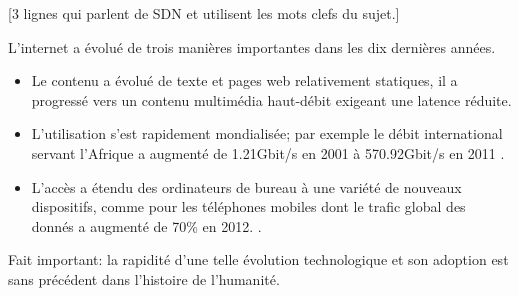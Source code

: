 
 


[3 lignes qui parlent de SDN et utilisent les mots clefs du sujet.]

L'internet a évolué de trois manières importantes dans les dix dernières années. 
\begin{itemize}
\item Le contenu a évolué de texte et pages web relativement statiques, il a progressé vers un contenu multimédia haut-débit exigeant une latence réduite. 
\item L'utilisation s'est rapidement mondialisée; par exemple le débit international servant l'Afrique a augmenté de 1.21Gbit/s en 2001 à 570.92Gbit/s en 2011 \cite{InternetGlobalGrowthImpactDevelopingCountries}.
\item  L'accès a étendu des ordinateurs de bureau à une variété de nouveaux dispositifs, comme pour les téléphones mobiles dont le trafic global des donnés a augmenté de 70\% en 2012. \cite{CiscoVNI2013}. 
\end{itemize}
Fait important: la rapidité d'une telle évolution technologique et son adoption est sans précédent dans l'histoire de l'humanité. 


